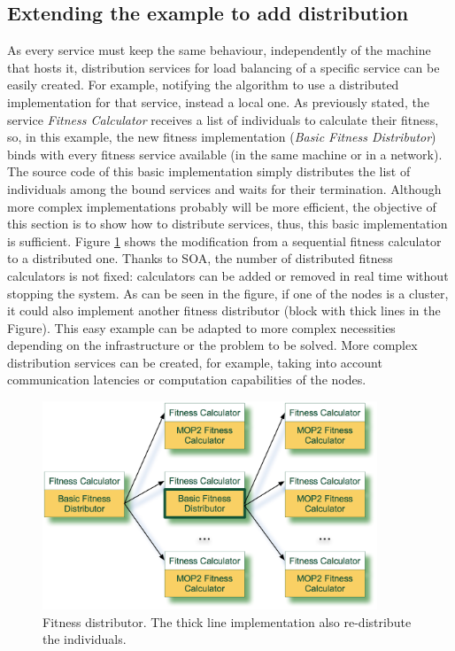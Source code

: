 \subsection{Extending the example to add distribution}
\label{sec:distribution}

As every service must keep the same behaviour, independently of the machine that hosts it, distribution services for load balancing of a specific service can be easily created. For example, notifying the algorithm to use a distributed implementation for that service, instead a local one. As previously stated, the service {\em Fitness Calculator} receives a list of individuals to calculate their fitness, so, in this example, the new fitness implementation ({\em Basic Fitness Distributor}) binds with every fitness service available (in the same machine or in a network). The source code of this basic implementation simply distributes the list of individuals among the bound services and waits for their termination. Although more complex implementations probably will be more efficient, the objective of this section is to show how to distribute services, thus, this basic implementation is sufficient. Figure \ref{FITNESSDISTRIBUTOR} shows the modification from a sequential fitness calculator to a distributed one. Thanks to SOA, the number of distributed fitness calculators is not fixed: calculators can be added or removed in real time without stopping the system. As can be seen in the figure, if one of the nodes is a cluster, it could also  implement another fitness distributor (block with thick lines in the Figure). This easy example can be adapted to more complex necessities depending on the infrastructure or the problem to be solved. More complex distribution services can be created, for example, taking into account communication latencies or computation capabilities of the nodes.




\begin{figure}
\centering
\includegraphics[width=10cm]{gfx/soaea/distributor.jpg}
\caption{Fitness distributor. The thick line implementation also re-distribute the individuals.}
\label{FITNESSDISTRIBUTOR}
\end{figure}



